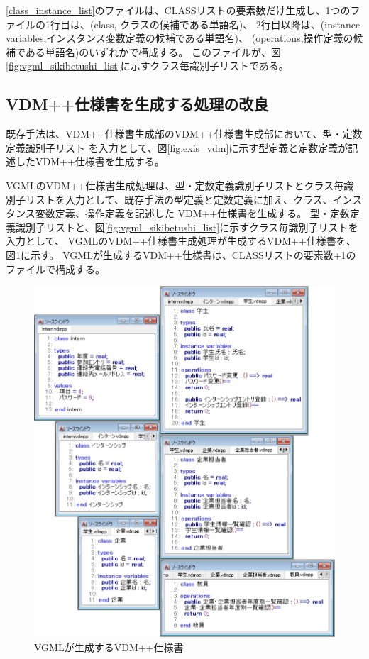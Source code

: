 \ref{class_instance_list}のファイルは、CLASSリストの要素数だけ生成し、1つのファイルの1行目は、(class, クラスの候補である単語名)、
2行目以降は、(instance variables,インスタンス変数定義の候補である単語名)、 (operations,操作定義の候補である単語名)のいずれかで構成する。
このファイルが、図\ref{fig:vgml_sikibetushi_list}に示すクラス毎識別子リストである。

\subsection{VDM++仕様書を生成する処理の改良}
既存手法は、VDM++仕様書生成部のVDM++仕様書生成部において、型・定数定義識別子リスト
を入力として、図\ref{fig:exis_vdm}に示す型定義と定数定義が記述したVDM++仕様書を生成する。

VGMLのVDM++仕様書生成処理は、型・定数定義識別子リストとクラス毎識別子リストを入力として、既存手法の型定義と定数定義に加え、クラス、インスタンス変数定義、操作定義を記述した
VDM++仕様書を生成する。
型・定数定義識別子リストと、図\ref{fig:vgml_sikibetushi_list}に示すクラス毎識別子リストを入力として、
VGMLのVDM++仕様書生成処理が生成するVDM++仕様書を、図\ref{fig:4_vdm}に示す。
VGMLが生成するVDM++仕様書は、CLASSリストの要素数+1のファイルで構成する。

\begin{figure}[t]
    \begin{center}
        \includegraphics[width=1.0\columnwidth]{image/4_vdm.png}
        \caption{VGMLが生成するVDM++仕様書}
        \label{fig:4_vdm}
    \end{center}
\end{figure}

